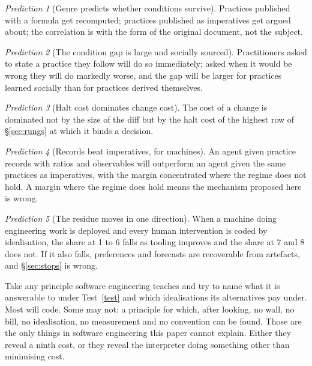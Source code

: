 \documentclass[11pt,oneside]{article}
\theoremstyle{definition}
\theoremstyle{remark}
\newtheorem{pred}{Prediction}
\begin{document}
\begin{pred}[Genre predicts whether conditions survive]
Practices published with a formula get recomputed; practices published as imperatives get
argued about; the correlation is with the form of the original document, not the subject.
\end{pred}

\begin{pred}[The condition gap is large and socially sourced]
Practitioners asked to state a practice they follow will do so immediately; asked when it
would be wrong they will do markedly worse, and the gap will be larger for practices
learned socially than for practices derived themselves.
\end{pred}

\begin{pred}[Halt cost dominates change cost]
The cost of a change is dominated not by the size of the diff but by the halt cost of the
highest row of \S\ref{sec:rungs} at which it binds a decision.
\end{pred}

\begin{pred}[Records beat imperatives, for machines]
An agent given practice records with ratios and observables will outperform an agent given
the same practices as imperatives, with the margin concentrated where the regime does not
hold. A margin where the regime does hold means the mechanism proposed here is wrong.
\end{pred}

\begin{pred}[The residue moves in one direction]
When a machine doing engineering work is deployed and every human intervention is coded by
idealisation, the share at 1 to 6 falls as tooling improves and the share at 7 and 8 does
not. If it also falls, preferences and forecasts are recoverable from artefacts, and
\S\ref{sec:stops} is wrong.
\end{pred}

Take any principle software engineering teaches and try to name what it is answerable to under
Test~\ref{test} and which idealisations its alternatives pay under. Most will code. Some may not: a principle for which, after looking, no wall, no bill, no
idealisation, no measurement and no convention can be found. Those are the only things in
software engineering this paper cannot explain. Either they reveal a ninth cost, or they reveal the
interpreter doing something other than minimising cost.

\end{document}
